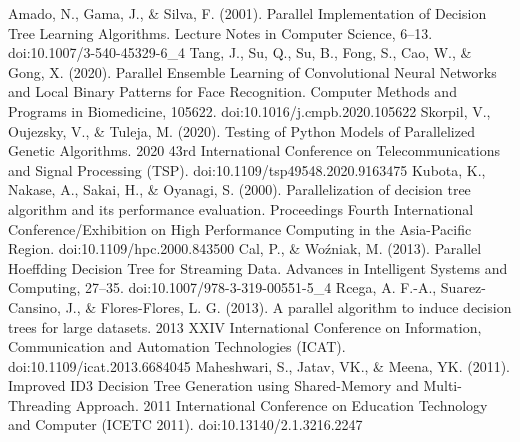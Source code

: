 \documentclass[12pt]{article}
\begin{document}
\begin{thebibliography}{6}

     Amado, N., Gama, J., \& Silva, F. (2001). Parallel Implementation of Decision Tree Learning Algorithms. Lecture Notes in Computer Science, 6–13. doi:10.1007/3-540-45329-6\_4 
     Tang, J., Su, Q., Su, B., Fong, S., Cao, W., \& Gong, X. (2020). Parallel Ensemble Learning of Convolutional Neural Networks and Local Binary Patterns for Face Recognition. Computer Methods and Programs in Biomedicine, 105622. doi:10.1016/j.cmpb.2020.105622
     Skorpil, V., Oujezsky, V., \& Tuleja, M. (2020). Testing of Python Models of Parallelized Genetic Algorithms. 2020 43rd International Conference on Telecommunications and Signal Processing (TSP). doi:10.1109/tsp49548.2020.9163475
     Kubota, K., Nakase, A., Sakai, H., \& Oyanagi, S. (2000). Parallelization of decision tree algorithm and its performance evaluation. Proceedings Fourth International Conference/Exhibition on High Performance Computing in the Asia-Pacific Region. doi:10.1109/hpc.2000.843500
     Cal, P., \& Woźniak, M. (2013). Parallel Hoeffding Decision Tree for Streaming Data. Advances in Intelligent Systems and Computing, 27–35. doi:10.1007/978-3-319-00551-5\_4
     Rcega, A. F.-A., Suarez-Cansino, J., \& Flores-Flores, L. G. (2013). A parallel algorithm to induce decision trees for large datasets. 2013 XXIV International Conference on Information, Communication and Automation Technologies (ICAT). doi:10.1109/icat.2013.6684045 
     Maheshwari, S., Jatav, VK., \& Meena, YK. (2011). Improved ID3 Decision Tree Generation using Shared-Memory and Multi-Threading Approach. 2011 International Conference on Education Technology and Computer (ICETC 2011). doi:10.13140/2.1.3216.2247

\end{thebibliography}
\end{document}

